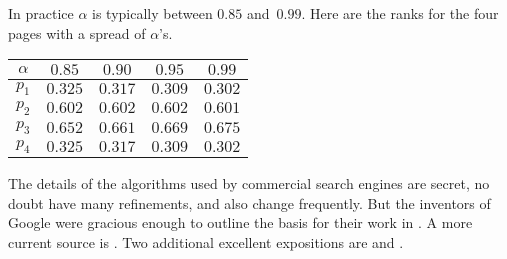 In practice $\alpha$ is typically between $0.85$ and~$0.99$.
Here are the ranks for the four pages with a spread of
$\alpha$'s.
\begin{center}
  \begin{tabular}{r|cccc}
    \multicolumn{1}{c}{$\alpha$}
          &$0.85$  &$0.90$  &$0.95$ &$0.99$ \\ \hline
    $p_1$ &$0.325$ &$0.317$ &$0.309$  &$0.302$  \\
    $p_2$ &$0.602$ &$0.602$ &$0.602$  &$0.601$  \\
    $p_3$ &$0.652$ &$0.661$ &$0.669$  &$0.675$  \\
    $p_4$ &$0.325$ &$0.317$ &$0.309$  &$0.302$  
  \end{tabular}
\end{center}


\medskip
The details of the algorithms used by commercial search engines are 
secret, no doubt have many refinements, and also change frequently.
But the inventors of Google were gracious enough to outline the basis for 
their work in \cite{BrinPage}.
A more current source is \cite{WikipediaPageRank}.
Two additional excellent expositions are 
\cite{Wills} and
\cite{Austin}.

